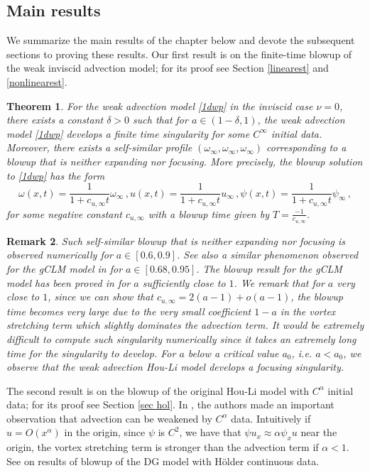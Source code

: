 \documentclass[12pt]{caltech_thesis}
\newtheorem{theorem}{Theorem}[section]
\newtheorem{remark}[theorem]{Remark}
\numberwithin{equation}{section}
\begin{document}
\subsection{Main results}
We summarize the main results of the chapter below and devote the subsequent sections to proving these results.
Our first result is on the finite-time blowup of the weak inviscid advection model; for its proof see Section \ref{linearest}  and \ref{nonlinearest}. 
\begin{theorem}
\label{t1}
For the weak advection model \eqref{1dwp} in the inviscid case $\nu=0$, there exists a constant $\delta>0$ such that for $a\in(1-\delta,1)$, the weak advection model \eqref{1dwp} develops a finite time singularity for some $C^{\infty}$ initial data. Moreover, there exists a self-similar profile $({\omega}_{\infty},{\omega}_{\infty},{\omega}_{\infty})$ corresponding to a blowup that is neither expanding nor focusing. More precisely, the blowup solution to \eqref{1dwp} has the form
$$\omega(x,t)=\frac{1}{1+c_{u,\infty}t}{\omega}_{\infty}\,,u(x,t)=\frac{1}{1+c_{u,\infty}t}u_{\infty}\,,\psi(x,t)=\frac{1}{1+c_{u,\infty}t}{\psi}_{\infty}\,,$$
for some negative constant $c_{u,\infty}$ with a blowup time given by $T= \frac{-1}{c_{u,\infty}}$.
\end{theorem}
\begin{remark}
    Such self-similar blowup that is neither expanding nor focusing is observed numerically for $a\in[0.6,0.9]$. See also a similar phenomenon observed for the gCLM model in \cite{lushnikov2021collapse} for $a\in[0.68,0.95]$. The blowup result for the gCLM model has been proved in \cite{chen2021slightly} for $a$ sufficiently close to $1$. We remark that for $a$ very close to $1$, since {we can show that $c_{u,\infty}=2(a-1)+o(a-1)$}, the blowup time becomes very large due to the very small coefficient {$1-a$} in the vortex stretching term {which slightly dominates the advection term}. It would be extremely difficult to compute such singularity numerically since it takes an extremely long time for the singularity to develop. For $a$ below a critical value $a_0$, i.e. $a < a_0$, we observe that the weak advection Hou-Li model develops a focusing singularity.
\end{remark}
The second result is on the blowup of the original Hou-Li model with $C^\alpha$ initial data; for its proof see Section \ref{sec hol}. In \cite{elgindi2020effects}, the authors made an important observation that advection can be weakened by $C^\alpha$ data. Intuitively if $u =O(x^\alpha)$ in the origin, since $\psi$ is $C^2$, we have that $\psi u_x\approx \alpha\psi_x u$ near the origin, the vortex stretching term is stronger than the advection term if $\alpha < 1$. See \cite{chen2021finite,chen2021regularity} on results of  blowup of the DG model with H\"older continuous data.
\end{document}
